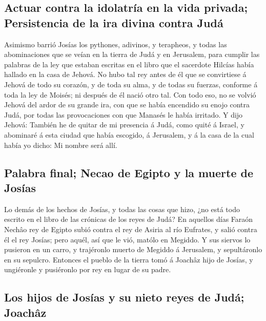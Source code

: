 \hypertarget{actuar-contra-la-idolatruxeda-en-la-vida-privada-persistencia-de-la-ira-divina-contra-juduxe1}{%
\subsection{Actuar contra la idolatría en la vida privada; Persistencia
de la ira divina contra
Judá}\label{actuar-contra-la-idolatruxeda-en-la-vida-privada-persistencia-de-la-ira-divina-contra-juduxe1}}

 Asimismo barrió Josías los pythones, adivinos, y
terapheos, y todas las abominaciones que se veían en la tierra de Judá y
en Jerusalem, para cumplir las palabras de la ley que estaban escritas
en el libro que el sacerdote Hilcías había hallado en la casa de Jehová.
 No hubo tal rey antes de él que se convirtiese á Jehová de
todo su corazón, y de toda su alma, y de todas su fuerzas, conforme á
toda la ley de Moisés; ni después de él nació otro tal. 
Con todo eso, no se volvió Jehová del ardor de su grande ira, con que se
había encendido su enojo contra Judá, por todas las provocaciones con
que Manasés le había irritado.  Y dijo Jehová: También he
de quitar de mi presencia á Judá, como quité á Israel, y abominaré á
esta ciudad que había escogido, á Jerusalem, y á la casa de la cual
había yo dicho: Mi nombre será allí.

\hypertarget{palabra-final-necao-de-egipto-y-la-muerte-de-josuxedas}{%
\subsection{Palabra final; Necao de Egipto y la muerte de
Josías}\label{palabra-final-necao-de-egipto-y-la-muerte-de-josuxedas}}

 Lo demás de los hechos de Josías, y todas las cosas que
hizo, ¿no está todo escrito en el libro de las crónicas de los reyes de
Judá?  En aquellos días Faraón Nechâo rey de Egipto subió
contra el rey de Asiria al río Eufrates, y salió contra él el rey
Josías; pero aquél, así que le vió, matólo en Megiddo.  Y
sus siervos lo pusieron en un carro, y trajéronlo muerto de Megiddo á
Jerusalem, y sepultáronlo en su sepulcro. Entonces el pueblo de la
tierra tomó á Joachâz hijo de Josías, y ungiéronle y pusiéronlo por rey
en lugar de su padre.

\hypertarget{los-hijos-de-josuxedas-y-su-nieto-reyes-de-juduxe1-joachuxe2z}{%
\subsection{Los hijos de Josías y su nieto reyes de Judá;
Joachâz}\label{los-hijos-de-josuxedas-y-su-nieto-reyes-de-juduxe1-joachuxe2z}}

